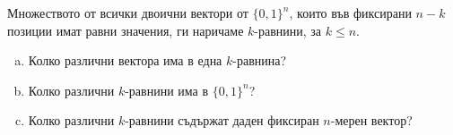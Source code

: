 
\begin{problem}
  Множеството от всички двоични вектори от $\{0,1\}^{n}$, които във фиксирани $n-k$ позиции имат равни значения,
  ги наричаме $k$-равнини, за $k\leq n$.
  \begin{enumerate}[a)]
  \item
    Колко различни вектора има в една $k$-равнина?
  \item
    Колко различни $k$-равнини има в $\{0,1\}^{n}$?
  \item
    Колко различни $k$-равнини съдържат даден фиксиран $n$-мерен вектор?
  \end{enumerate}
\end{problem}



